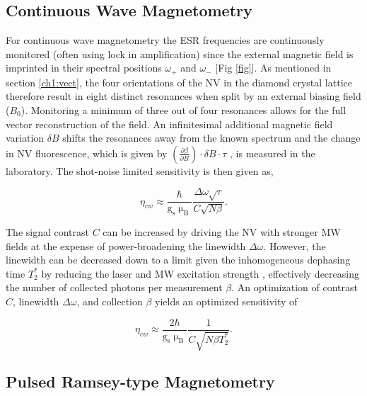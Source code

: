 
\subsection{Continuous Wave Magnetometry}

For continuous wave magnetometry the ESR frequencies are continuously monitored (often using lock in amplification) since the external magnetic field is imprinted in their spectral positions $\omega_+$ and $\omega_-$ [Fig \ref{fig}]. As mentioned in section \ref{ch1:vect}, the four orientations of the NV in the diamond crystal lattice therefore result in eight distinct resonances when split by an external biasing field ($B_0$). Monitoring a minimum of three out of four resonances allows for the full vector reconstruction of the field. An infinitesimal additional magnetic field variation $\delta B$ shifts the resonances away from the known spectrum and the change in NV fluorescence, which is given by $\left(\frac{\partial \beta}{\partial B}\right) \cdot \delta B \cdot \tau$ \cite{rondin2014magnetometry}, is measured in the laboratory. The shot-noise limited sensitivity is then given as,

$$ \eta_{cw} \approx \frac{\hbar}{\text{g}_\text{s} \upmu_\text{B}} \frac{\Delta \omega \sqrt{\tau}}{C\sqrt{N \beta}}. $$  

The signal contrast $C$ can be increased by driving the NV with stronger MW fields at the expense of power-broadening the linewidth $\Delta \omega$. However, the linewidth can be decreased down to a limit given the inhomogeneous dephasing time $T_2^*$ by reducing the laser and MW excitation strength \cite{dreau2011avoiding}, effectively decreasing the number of collected photons per measurement $\beta$. An optimization of contrast $C$, linewidth $\Delta \omega$, and collection $\beta$ yields an optimized sensitivity of \cite{pham2013magnetic}

$$ \eta_{cw} \approx  \frac{2\hbar}{\text{g}_\text{s} \upmu_\text{B}} \frac{1}{C\sqrt{N \beta T_2^*}} . $$

\subsection{Pulsed Ramsey-type Magnetometry} \label{Pulsed_Ramsey}

